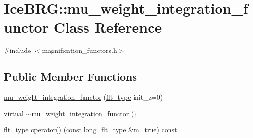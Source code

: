 \hypertarget{classIceBRG_1_1mu__weight__integration__functor}{\section{Ice\-B\-R\-G\-:\-:mu\-\_\-weight\-\_\-integration\-\_\-functor Class Reference}
\label{classIceBRG_1_1mu__weight__integration__functor}
}


{\ttfamily \#include $<$magnification\-\_\-functors.\-h$>$}

\subsection*{Public Member Functions}
\begin{DoxyCompactItemize}
\item 
\hyperlink{classIceBRG_1_1mu__weight__integration__functor_abc1c2feebc153cc714461341e1677b98}{mu\-\_\-weight\-\_\-integration\-\_\-functor} (\hyperlink{lib_2IceBRG__main_2common_8h_ad0f130a56eeb944d9ef2692ee881ecc4}{flt\-\_\-type} init\-\_\-z=0)
\item 
virtual \hyperlink{classIceBRG_1_1mu__weight__integration__functor_af95375b93119d9f6cbab297d3b357a66}{$\sim$mu\-\_\-weight\-\_\-integration\-\_\-functor} ()
\item 
\hyperlink{lib_2IceBRG__main_2common_8h_ad0f130a56eeb944d9ef2692ee881ecc4}{flt\-\_\-type} \hyperlink{classIceBRG_1_1mu__weight__integration__functor_af0d9d5e75b915dcf7a20f48c88d47145}{operator()} (const \hyperlink{lib_2IceBRG__main_2common_8h_a7040956e7e1b504d34a9ccfb4253bdce}{long\-\_\-flt\-\_\-type} \&\hyperlink{namespaceIceBRG_ada6365c5d16106f0608afbd34f010bcc}{m}=true) const 
\end{DoxyCompactItemize}


